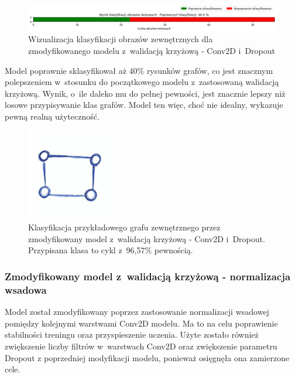 \begin{figure}[ht]
	\centering
	\includegraphics[width=15.5cm]{resources/tests/images/v4/crossvalid_1_bar.png}
	\caption{Wizualizacja klasyfikacji obrazów zewnętrznych dla zmodyfikowanego modelu z~walidacją krzyżową - Conv2D i~Dropout}
	\label{Fig:tests-cv-1c}
\end{figure}
\FloatBarrier

Model poprawnie sklasyfikował aż 40\% rysunków grafów,
co jest znacznym polepszeniem w~stosunku do początkowego modelu z~zastosowaną walidacją krzyżową.
Wynik, o~ile daleko mu do pełnej pewności, jest znacznie lepszy niż losowe przypisywanie klas grafów.
Model ten więc, choć nie idealny, wykazuje pewną realną użyteczność.

\begin{figure}[ht]
	\centering
	\includegraphics[height=4cm]{../graph_classification/test_graphs/drawn/cycle-6.png}
	\caption{Klasyfikacja przykładowego grafu zewnętrznego przez zmodyfikowany model z~walidacją krzyżową - Conv2D i~Dropout.
		Przypisana klasa to cykl z~96,57\% pewnością.}
	\label{Fig:tests-cv-1d}
\end{figure}
\FloatBarrier

\subsubsection{Zmodyfikowany model z~walidacją krzyżową - normalizacja wsadowa}

Model został zmodyfikowany poprzez zastosowanie normalizacji wsadowej pomiędzy kolejnymi warstwami Conv2D modelu.
Ma to na celu poprawienie stabilności treningu oraz przyspieszenie uczenia.
Użyte zostało również zwiększenie liczby filtrów w~warstwach Conv2D oraz zwiększenie parametru Dropout
z poprzedniej modyfikacji modelu, ponieważ osięgnęła ona zamierzone cele.

